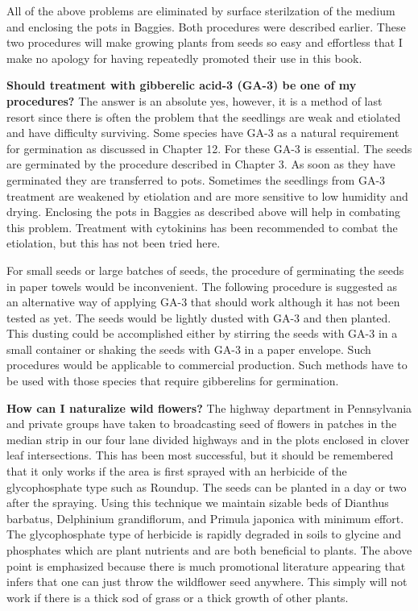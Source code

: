 All of the above problems are eliminated by surface sterilzation of the medium
and enclosing the pots in Baggies. Both procedures were described earlier. These
two procedures will make growing plants from seeds so easy and effortless that I make
no apology for having repeatedly promoted their use in this book.

\textbf{Should treatment with gibberelic acid-3 (GA-3) be one of my
procedures?} The answer is an absolute yes, however, it is a method of last resort
since there is often the problem that the seedlings are weak and etiolated and have
difficulty surviving. Some species have GA-3 as a natural requirement for germination
as discussed in Chapter 12. For these GA-3 is essential. The seeds are germinated
by the procedure described in Chapter 3. As soon as they have germinated they are
transferred to pots. Sometimes the seedlings from GA-3 treatment are weakened by
etiolation and are more sensitive to low humidity and drying. Enclosing the pots in
Baggies as described above will help in combating this problem. Treatment with
cytokinins has been recommended to combat the etiolation, but this has not been tried
here.

For small seeds or large batches of seeds, the procedure of germinating the
seeds in paper towels would be inconvenient. The following procedure is suggested
as an alternative way of applying GA-3 that should work although it has not been
tested as yet. The seeds would be lightly dusted with GA-3 and then planted. This
dusting could be accomplished either by stirring the seeds with GA-3 in a small
container or shaking the seeds with GA-3 in a paper envelope. Such procedures
would be applicable to commercial production. Such methods have to be used with
those species that require gibberelins for germination.

\textbf{How can I naturalize wild flowers?} The highway department in
Pennsylvania and private groups have taken to broadcasting seed of flowers in
patches in the median strip in our four lane divided highways and in the plots enclosed
in clover leaf intersections. This has been most successful, but it should be
remembered that it only works if the area is first sprayed with an herbicide of the
glycophosphate type such as Roundup. The seeds can be planted in a day or two
after the spraying. Using this technique we maintain sizable beds of Dianthus
barbatus, Delphinium grandiflorum, and Primula japonica with minimum effort. The
glycophosphate type of herbicide is rapidly degraded in soils to glycine and
phosphates which are plant nutrients and are both beneficial to plants. The above
point is emphasized because there is much promotional literature appearing that
infers that one can just throw the wildflower seed anywhere. This simply will not work
if there is a thick sod of grass or a thick growth of other plants.

